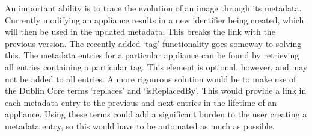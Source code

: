 An important ability is to trace the evolution of an image through its metadata. Currently modifying an appliance
results in a new identifier being created, which will then be used in the updated metadata. This 
breaks the link with the previous version. The recently added `tag' functionality goes someway to solving this.  
The metadata entries for a particular appliance can be found by retrieving all entries containing a particular tag. 
This element is optional, however, and may not be added to all entries. A more rigourous solution would be 
to make use of the Dublin Core terms `replaces' and `isReplacedBy'. This would provide a link in each metadata 
entry to the previous and next entries in the lifetime of an appliance. Using these terms could add a significant 
burden to the user creating a metadata entry, so this would have to be automated as much as possible.
